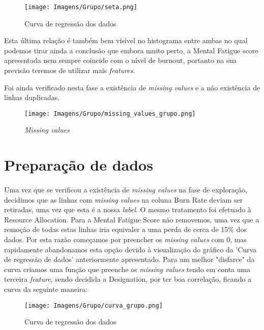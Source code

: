 \begin{figure}[H]
    \centering
    \centerline{\texttt{[image: Imagens/Grupo/seta.png]}}
    \caption{Curva de regressão dos dados}
    \label{fig: grafico_azul_grupo}
\end{figure}

Esta última relação é também bem visível no histograma entre ambas no qual podemos tirar ainda a conclusão que embora muito perto, a Mental Fatigue score apresentada nem sempre coincide com o nível de burnout, portanto na sua previsão teremos de utilizar mais \textit{features}.

Foi ainda verificado nesta fase a existência de \textit{missing values} e a não existência de linhas duplicadas.

\begin{figure}[H]
    \centering
    \centerline{\texttt{[image: Imagens/Grupo/missing\_values\_grupo.png]}}
    \caption{\textit{Missing values}}
    \label{fig: missing_values_grupo}
\end{figure}

\section{Preparação de dados}
\paragraph{}
Uma vez que se verificou a existência de \textit{missing values} na fase de exploração, decidimos que as linhas com \textit{missing values} na coluna Burn Rate deviam ser retiradas, uma vez que esta é a nossa \textit{label}. O mesmo tratamento foi efetuado à Resource Allocation.
Para a Mental Fatigue Score não removemos, uma vez que a remoção de todas estas linhas iria equivaler a uma perda de cerca de 15\% dos dados. Por esta razão começamos por preencher os \textit{missing values} com 0, mas rapidamente abandonamos esta opção devido à visualização do gráfico da 'Curva de regressão de dados' anteriormente apresentado. Para um melhor "disfarce" da curva criamos uma função que preenche os \textit{missing values} tendo em conta uma terceira \textit{feature}, sendo decidida a Designation, por ter boa correlação, ficando a curva da seguinte maneira:

\begin{figure}[H]
    \centering
    \centerline{\texttt{[image: Imagens/Grupo/curva\_grupo.png]}}
    \caption{Curva de regressão dos dados}
    \label{fig: curva_grupo}
\end{figure}

